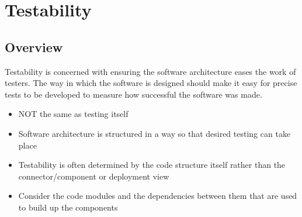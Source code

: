 \documentclass{report}
\begin{document}
\chapter{Testability}
\section{Overview}
Testability is concerned with ensuring the software architecture eases the work of testers. The way in which the software is designed should make it easy for precise tests to be developed to measure how successful the software was made.
\begin{itemize}
\item NOT the same as testing itself
\item Software architecture is structured in a way so that desired testing can take place
\item Testability is often determined by the code structure itself rather than the connector/component or deployment view
\item Consider the code modules and the dependencies between them that are used to build up the components
\end{itemize}
\end{document}
